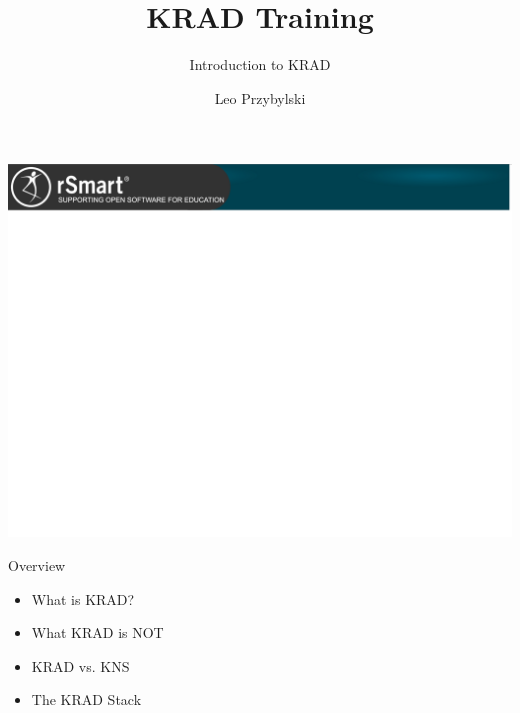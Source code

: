 \documentclass[xcolor=dvipsnames,14pt,professionalfonts]{beamer}
\begin{document}
\title{KRAD Training}
\subtitle{Introduction to KRAD}
\author[Leo]{Leo Przybylski}

\usebackgroundtemplate%
{%
    \includegraphics[width=\paperwidth,height=\paperheight]{../img/header.png}%
}

{
%
\begin{frame}[plain]
  \titlepage
\end{frame}
}

\begin{frame}{Overview}
  \begin{itemize}
    \item What is KRAD?
    \item What KRAD is NOT
    \item KRAD vs. KNS
    \item The KRAD Stack
  \end{itemize}
\end{frame}
\end{document}
